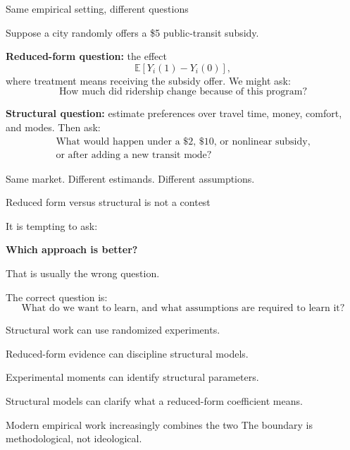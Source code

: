 \documentclass[aspectratio=169,11pt]{beamer}
\newcommand{\E}{\mathbb{E}}
\begin{document}
\begin{frame}{Same empirical setting, different questions}

Suppose a city randomly offers a \$5 public-transit subsidy.

\textbf{Reduced-form question:} the effect
\[
\E[Y_i(1)-Y_i(0)],
\]
where treatment means receiving the subsidy offer. We might ask:
\[
\boxed{
\text{How much did ridership change because of this program?}
}
\]

\vspace{0.25em}

\textbf{Structural question:} estimate preferences over travel time, money,
comfort, and modes. Then ask:
\[
\boxed{
\begin{array}{c}
\text{What would happen under a \$2, \$10, or nonlinear subsidy,}\\
\text{or after adding a new transit mode?}
\end{array}
}
\]

Same market. Different estimands. Different assumptions.

\end{frame}

\begin{frame}{Reduced form versus structural is not a contest}

It is tempting to ask:

\begin{center}
\Large
\textbf{Which approach is better?}
\end{center}

That is usually the wrong question.

\vspace{0.4em}

The correct question is:
\[
\boxed{
\text{What do we want to learn,
and what assumptions are required to learn it?}
}
\]

\vspace{0.4em}

Structural work can use randomized experiments.

Reduced-form evidence can discipline structural models.

Experimental moments can identify structural parameters.

Structural models can clarify what a reduced-form coefficient means.

\vspace{0.35em}

\begin{block}{Modern empirical work increasingly combines the two}
The boundary is methodological, not ideological.
\end{block}

\end{frame}
\end{document}
